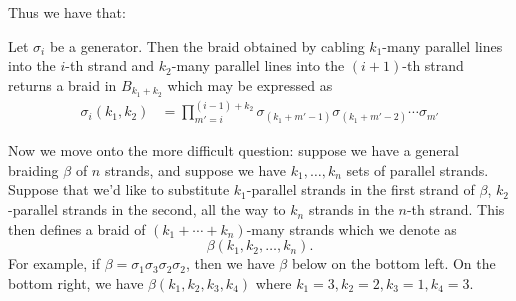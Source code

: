 Thus we have that: 
\begin{lemma}
    Let $\sigma_i$ be a generator. Then the braid obtained by cabling 
    $k_1$-many parallel lines into the $i$-th strand and $k_2$-many parallel lines 
    into the $(i+1)$-th strand returns a braid in $B_{k_1 + k_2}$ which may 
    be expressed as 
    \begin{align*}
        \sigma_i(k_1, k_2)
        &=
        \prod_{m' = i}^{(i-1) + k_2}\sigma_{(k_1 + m'-1)}\sigma_{(k_1 + m'-2)}\cdots\sigma_{m'}
    \end{align*}
\end{lemma}

Now we move onto the more difficult question:
suppose we have a general braiding $\beta$ of $n$ strands, 
and suppose we have $k_1, \dots, k_n$ sets of parallel strands. Suppose that we'd 
like to substitute $k_1$-parallel strands in the first strand of $\beta$, 
$k_2$-parallel strands in the second, all the way to $k_n$ strands in
the $n$-th strand. This then defines a braid of $(k_1 + \cdots + k_n)$-many strands
which we denote as 
\[
    \beta(k_1, k_2, \dots, k_n).
\]
For example, if $\beta = \sigma_1\sigma_3\sigma_2\sigma_2$,
then we have $\beta$ below on the bottom left. On the bottom right, 
we have $\beta(k_1, k_2, k_3, k_4)$
where $k_1 = 3, k_2 = 2, k_3 = 1, k_4 = 3$.

